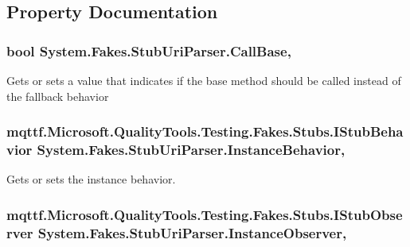 \subsection{Property Documentation}
\hypertarget{class_system_1_1_fakes_1_1_stub_uri_parser_a0b29308f1d957393f2a98bb7e1f02283}{
\subsubsection[{Call\-Base}]{\setlength{\rightskip}{0pt plus 5cm}bool System.\-Fakes.\-Stub\-Uri\-Parser.\-Call\-Base\hspace{0.3cm}{\ttfamily [get]}, {\ttfamily [set]}}}\label{class_system_1_1_fakes_1_1_stub_uri_parser_a0b29308f1d957393f2a98bb7e1f02283}


Gets or sets a value that indicates if the base method should be called instead of the fallback behavior

\hypertarget{class_system_1_1_fakes_1_1_stub_uri_parser_aa633895a425f3afe8f05b4d9718ea021}{
\subsubsection[{Instance\-Behavior}]{\setlength{\rightskip}{0pt plus 5cm}mqttf.\-Microsoft.\-Quality\-Tools.\-Testing.\-Fakes.\-Stubs.\-I\-Stub\-Behavior System.\-Fakes.\-Stub\-Uri\-Parser.\-Instance\-Behavior\hspace{0.3cm}{\ttfamily [get]}, {\ttfamily [set]}}}\label{class_system_1_1_fakes_1_1_stub_uri_parser_aa633895a425f3afe8f05b4d9718ea021}


Gets or sets the instance behavior.

\hypertarget{class_system_1_1_fakes_1_1_stub_uri_parser_a85d41ddf8554b7a760a15e5a027890b9}{
\subsubsection[{Instance\-Observer}]{\setlength{\rightskip}{0pt plus 5cm}mqttf.\-Microsoft.\-Quality\-Tools.\-Testing.\-Fakes.\-Stubs.\-I\-Stub\-Observer System.\-Fakes.\-Stub\-Uri\-Parser.\-Instance\-Observer\hspace{0.3cm}{\ttfamily [get]}, {\ttfamily [set]}}}\label{class_system_1_1_fakes_1_1_stub_uri_parser_a85d41ddf8554b7a760a15e5a027890b9}


